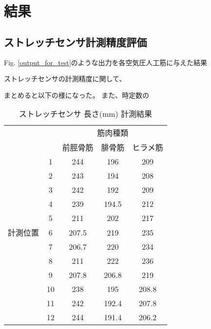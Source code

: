\section{結果}
\subsection{ストレッチセンサ計測精度評価}
Fig. \ref{output_for_test}のような出力を各空気圧人工筋に与えた結果

ストレッチセンサの計測精度に関して、


まとめると以下の様になった。
また、時定数の
\begin{table}[h]
    \caption{ストレッチセンサ 長さ(mm) 計測結果}
    \label{strain}
    \begin{center}
        \begin{tabular}{|c|c|ccc|}\hline
            \multicolumn{2}{|c|}{} & \multicolumn{3}{c|}{筋肉種類}\\
            \cline{3-5}
            \multicolumn{2}{|c|}{} & 前脛骨筋 & 腓骨筋 & ヒラメ筋 \\ \hline
            & 1 & 244 & 196 & 209 \\ \cline{2-5}
            & 2 & 243 & 194 & 208 \\ \cline{2-5}
            & 3 & 242 & 192 & 209 \\ \cline{2-5}
            & 4 & 239 & 194.5 & 212 \\ \cline{2-5}
            & 5 & 211 & 202 & 217 \\ \cline{2-5}
            計測位置 & 6 & 207.5 & 219 & 235 \\ \cline{2-5}
            & 7 & 206.7 & 220 & 234 \\ \cline{2-5}
            & 8 & 211 & 222 & 236 \\ \cline{2-5}
            & 9 & 207.8 & 206.8 & 219 \\ \cline{2-5}
            & 10 & 238 & 195 & 208.8 \\ \cline{2-5}
            & 11 & 242 & 192.4 & 207.8 \\ \cline{2-5}
            & 12 & 244 & 191.4 & 206.2 \\ \hline
        \end{tabular}
    \end{center}
\end{table}

\newpage

